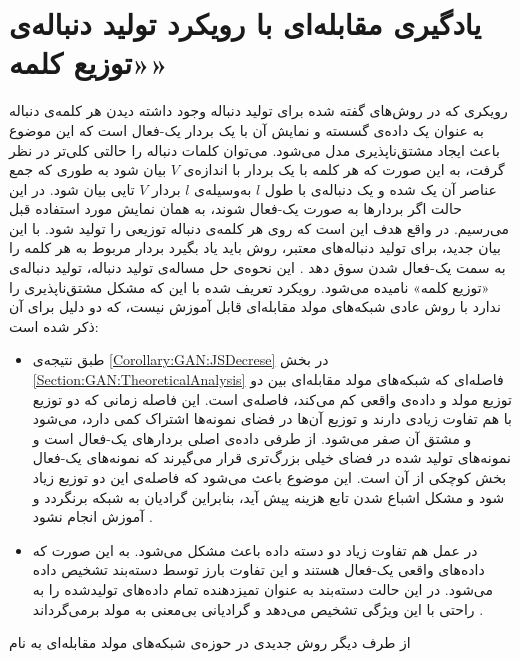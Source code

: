  \section{یادگیری مقابله‌ای با رویکرد تولید دنباله‌ی «توزیع کلمه»}\label{Ch2:Section:Method:SequenceOfDistribution}
رویکری که  در روش‌های گفته شده برای تولید دنباله وجود داشته دیدن هر کلمه‌ی دنباله به عنوان یک داده‌ی گسسته و نمایش آن با یک بردار یک-فعال است که این موضوع باعث ایجاد مشتق‌ناپذیری مدل می‌شود.
 می‌توان کلمات دنباله را حالتی کلی‌تر در نظر گرفت، به این صورت که هر کلمه با یک بردار با اندازه‌ی $V$ بیان شود به طوری که جمع عناصر آن یک شده و  یک دنباله‌ی با طول $l$ به‌وسیله‌ی $l$ بردار $V$ تایی بیان شود. در این حالت اگر بردار‌ها به صورت یک-فعال  شوند، به همان نمایش مورد استفاده قبل می‌رسیم. در واقع هدف این است که روی هر کلمه‌ی دنباله توزیعی را تولید شود.  با این بیان جدید، برای تولید دنباله‌های معتبر، روش باید یاد بگیرد بردار مربوط به هر کلمه را به سمت یک-فعال شدن سوق دهد
\cite{Gulrajaniy17ImprovedWasserstein,subramanian2017adversarial,press2017langwasserstein}.
  این نحوه‌ی حل مساله‌ی تولید دنباله، تولید دنباله‌ی «توزیع کلمه» نامیده می‌شود.
 \newline
رویکرد تعریف شده با این که مشکل مشتق‌ناپذیری را ندارد با روش عادی شبکه‌های مولد مقابله‌ای قابل آموزش نیست، که دو دلیل برای آن ذکر شده است:
\begin{itemize}
	\item 
	طبق نتیجه‌ی
	\ref{Corollary:GAN:JSDecrese}
	در بخش
	\ref{Section:GAN:TheoreticalAnalysis}
فاصله‌ای که شبکه‌های مولد مقابله‌ای بین دو توزیع مولد و داده‌ی واقعی کم می‌کند، فاصله‌ی
	است. این فاصله زمانی که دو توزیع با هم تفاوت زیادی دارند و  توزیع آن‌ها در فضای نمونه‌ها اشتراک کمی دارد، 
	می‌شود و مشتق آن صفر می‌شود. از طرفی داده‌ی اصلی بردار‌های یک-فعال است و نمونه‌های تولید شده در فضای خیلی بزرگ‌تری قرار می‌گیرند که نمونه‌های یک-فعال بخش کوچکی از آن است. این موضوع باعث می‌شود که فاصله‌ی این دو توزیع زیاد شود و مشکل اشباع شدن تابع هزینه پیش آید، بنابراین گرادیان به شبکه برنگردد و آموزش انجام نشود
	\cite{Gulrajaniy17ImprovedWasserstein}.
	\item
	در عمل هم تفاوت زیاد دو دسته داده باعث مشکل می‌شود. به این صورت که داده‌های واقعی یک-فعال هستند و این تفاوت بارز توسط دسته‌بند تشخیص داده می‌شود. در این حالت دسته‌بند به عنوان تمیزدهنده تمام داده‌های تولید‌شده را به راحتی با این ویژگی تشخیص می‌دهد و گرادیانی بی‌معنی به مولد برمی‌گرداند
		\cite{Gulrajaniy17ImprovedWasserstein}.	
\end{itemize}
 از طرف دیگر روش جدیدی در حوزه‌ی شبکه‌های مولد مقابله‌ای به نام
